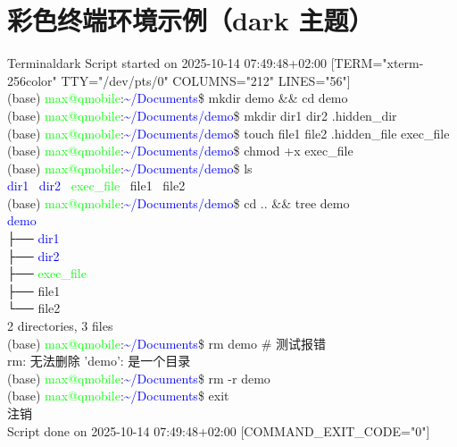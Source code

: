 \documentclass{ctexart}
\begin{document}
\section*{彩色终端环境示例（dark 主题）}

\begin{terminalcolored}{Terminal}{dark}
Script started on 2025-10-14 07:49:48+02:00 [TERM="xterm-256color" TTY="/dev/pts/0" COLUMNS="212" LINES="56"] \\
(base) \textcolor{lime}{max@qmobile}:\textcolor{blue}{\textasciitilde{}/Documents}\$ mkdir demo \&\& cd demo \\
(base) \textcolor{lime}{max@qmobile}:\textcolor{blue}{\textasciitilde{}/Documents/demo}\$ mkdir dir1 dir2 .hidden\_dir \\
(base) \textcolor{lime}{max@qmobile}:\textcolor{blue}{\textasciitilde{}/Documents/demo}\$ touch file1 file2 .hidden\_file exec\_file \\
(base) \textcolor{lime}{max@qmobile}:\textcolor{blue}{\textasciitilde{}/Documents/demo}\$ chmod +x exec\_file \\
(base) \textcolor{lime}{max@qmobile}:\textcolor{blue}{\textasciitilde{}/Documents/demo}\$ ls \\
\textcolor{blue}{dir1}  \ \textcolor{blue}{dir2}  \ \textcolor{lime}{exec\_file}  \ file1  \ file2 \\
(base) \textcolor{lime}{max@qmobile}:\textcolor{blue}{\textasciitilde{}/Documents/demo}\$ cd .. \&\& tree demo \\
\textcolor{blue}{demo} \\
├── \textcolor{blue}{dir1} \\
├── \textcolor{blue}{dir2} \\
├── \textcolor{lime}{exec\_file} \\
├── file1 \\
└── file2 \\

2 directories, 3 files \\
(base) \textcolor{lime}{max@qmobile}:\textcolor{blue}{\textasciitilde{}/Documents}\$ rm demo \# 测试报错 \\
rm: 无法删除 'demo': 是一个目录 \\
(base) \textcolor{lime}{max@qmobile}:\textcolor{blue}{\textasciitilde{}/Documents}\$ rm -r demo \\
(base) \textcolor{lime}{max@qmobile}:\textcolor{blue}{\textasciitilde{}/Documents}\$ exit \\
注销 \\

Script done on 2025-10-14 07:49:48+02:00 [COMMAND\_EXIT\_CODE="0"] \\
\end{terminalcolored}
\end{document}

